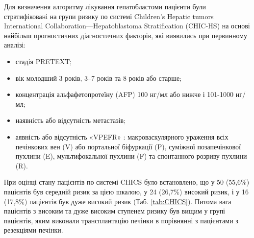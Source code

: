 Для визначення алгоритму лікування гепатобластоми пацієнти були стратифіковані на групи ризику по системі Children’s Hepatic tumors International Collaboration—Hepatoblastoma Stratification (CHIC-HS) на основі найбільш прогностичних діагностичних факторів, які виявились при первинному аналізі: 

\begin{itemize}
    \item стадія PRETEXT; 
    \item вік молодший 3 років, 3–7 років та 8 років або старше;
    \item концентрація альфафетопротеїну (AFP) 100 нг/мл або нижче і 101-1000 нг/мл;
    \item наявність або відсутність метастазів;
    \item аявність або відсутність «VPEFR» : макроваскулярного ураження всіх печінкових вен (V) або портальної біфуркації (P), суміжної позапечінкової пухлини (E), мультифокальної пухлини (F) та спонтанного розриву пухлини (R).
\end{itemize}

При оцінці стану пацієнтів по системі CHICS було встановлено, що у 50 (55,6\%) пацієнтів був середній ризик за цією шкалою, у 24 (26,7\%) високий ризик, і у 16 (17,8\%) пацієнтів був дуже високий ризик  (Таб. \ref{tab:CHICS}). Питома вага пацієнтів з високим та дуже високим ступенем ризику був вищим у групі пацієнтів, яким виконали трансплантацію печінки в порівнянні з пацієнтами з резекціями печінки.






